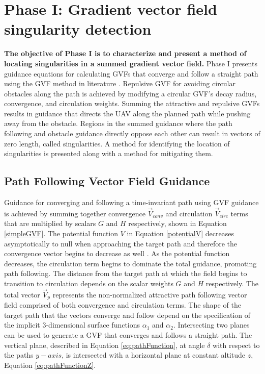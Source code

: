 \documentclass[numbered,pdftex]{ohio-etd}
\begin{document}
\section{Phase I: Gradient vector field singularity detection}
 \textbf{The objective of Phase I is to characterize and present a method of locating singularities in a summed gradient vector field.} Phase I presents guidance equations for calculating GVFs that converge and follow a straight path using the GVF method in literature \cite{goncalves_artificial_2009,goncalves_circulation_2010,goncalves_vector_2010}. Repulsive GVF for avoiding circular obstacles along the path is achieved by modifying a circular GVF's decay radius, convergence, and circulation weights. Summing the attractive and repulsive GVFs results in guidance that directs the UAV along the planned path while pushing away from the obstacle. Regions in the summed guidance where the path following and obstacle guidance directly oppose each other can result in vectors of zero length, called singularities. A method for identifying the location of singularities is presented along with a method for mitigating them. 
 

\subsection{Path Following Vector Field Guidance}
Guidance for converging and following a time-invariant path using GVF guidance is achieved by summing together convergence $\overrightarrow{V}_{conv}$ and circulation $\overrightarrow{V}_{circ}$ terms that are multiplied by scalars $G$ and $H$ respectively, shown in Equation \ref{simpleGVF}. The potential function $V$ in Equation \ref{potentialV} decreases asymptotically to null when approaching the target path and therefore the convergence vector begins to decrease as well \cite{goncalves_artificial_2009}. As the potential function decreases, the circulation term begins to dominate the total guidance, promoting path following. The distance from the target path at which the field begins to transition to circulation depends on the scalar weights $G$ and $H$ respectively. The total vector $\overrightarrow{V}_p$ represents the non-normalized attractive path following vector field comprised of both convergence and circulation terms. The shape of the target path that the vectors converge and follow depend on the specification of the implicit 3-dimensional surface functions $\alpha_1$ and $\alpha_2$. Intersecting two planes can be used to generate a GVF that converges and follows a straight path. The vertical plane, described in Equation \ref{eq:pathFunction}, at angle $\delta$ with respect to the paths $y-axis$, is intersected with a horizontal plane at constant altitude $z$, Equation \ref{eq:pathFunctionZ}.
\end{document}
